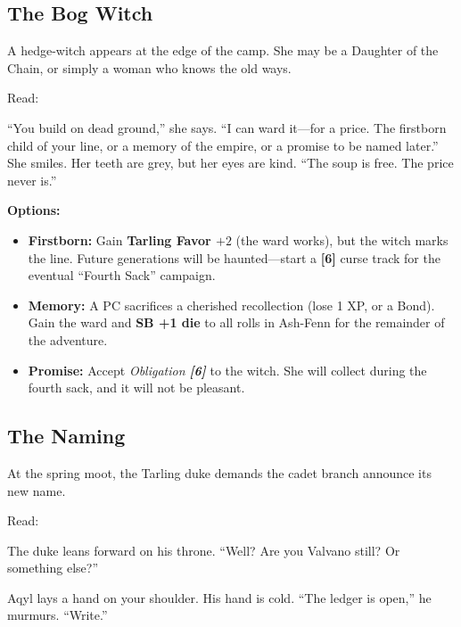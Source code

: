 \documentclass[11pt,a5paper]{book}
\newcommand{\sb}[1]{\textbf{SB #1}}
\newcommand{\clock}[1]{\textbf{[#1]}}
\newcommand{\condition}[1]{\textit{#1}}
\begin{document}
\subsection*{The Bog Witch}

A hedge-witch appears at the edge of the camp. She may be a Daughter of the Chain, or simply a woman who knows the old ways.

Read:
\begin{quoting}
``You build on dead ground,'' she says. ``I can ward it---for a price. The firstborn child of your line, or a memory of the empire, or a promise to be named later.'' She smiles. Her teeth are grey, but her eyes are kind. ``The soup is free. The price never is.''
\end{quoting}

\textbf{Options:}
\begin{itemize}[leftmargin=*]
\item \textbf{Firstborn:} Gain \textbf{Tarling Favor $+2$} (the ward works), but the witch marks the line. Future generations will be haunted---start a \clock{6} curse track for the eventual ``Fourth Sack'' campaign.
\item \textbf{Memory:} A PC sacrifices a cherished recollection (lose 1 XP, or a Bond). Gain the ward and \sb{+1 die} to all rolls in Ash-Fenn for the remainder of the adventure.
\item \textbf{Promise:} Accept \condition{Obligation \clock{6}} to the witch. She will collect during the fourth sack, and it will not be pleasant.
\end{itemize}

\subsection*{The Naming}

At the spring moot, the Tarling duke demands the cadet branch announce its new name.

Read:
\begin{quoting}
The duke leans forward on his throne. ``Well? Are you Valvano still? Or something else?'' 

Aqyl lays a hand on your shoulder. His hand is cold. ``The ledger is open,'' he murmurs. ``Write.''
\end{quoting}
\end{document}
